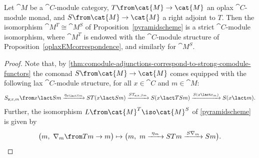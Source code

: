 \begin{proposition}\label{EMMonadCorrespondence}
  Let \(\cat{M}\) be a \(\cat{C}\)\hyp{}module category,
  \(T\from \cat{M} \to \cat{M}\) an oplax \(\cat{C}\)\hyp{}module monad,
  and \(S\from \cat{M} \to \cat{M}\) a right adjoint to \(T\).
  Then the isomorphism \(\cat{M}^T \cong \cat{M}^S\) of Proposition~\ref{pyramidscheme} is a strict \(\cat{C}\)\hyp{}module isomorphism,
  where \(\cat{M}^T\) is endowed with the \(\cat{C}\)\hyp{}module structure of Proposition~\ref{oplaxEMcorrespondence},
  and similarly for \(\cat{M}^S\).
\end{proposition}
\begin{proof}
  Note that,
  by \cref{thm:comodule-adjunctions-correspond-to-strong-comodule-functors}
  the comonad \(S\from \cat{M}\to \cat{M}\) comes equipped with the following lax \(\cat{C}\)\hyp{}module structure,
  for all \(x \in \cat{C}\) and \(m \in \cat{M}\):
  \[
    S_{\mathsf{a}; x, m} \from
    x \lact S m
    \xrightarrow{\eta_{x \lact S m}} S T(x \lact S m)
    \xrightarrow{S T_{\mathsf{a}; x, S m}} S(x \lact TS m)
    \xrightarrow{S(x \lact \varepsilon_m)} S(x \lact m).
  \]
  Further, the isomorphism \(L\from \cat{M}^T \iso \cat{M}^S\) of \cref{pyramidscheme} is given by
  \[
    \big(m,\ \nabla_m\from Tm \to m\big) \mapsto \big(m,\ m \xrightarrow{\ \eta_m\ } S Tm \xrightarrow{\,S\nabla_m\,} S m\big).
  \]


\end{proof}
